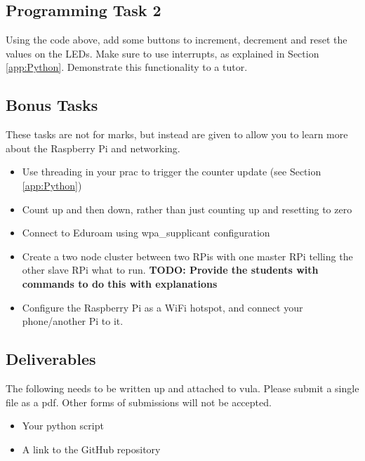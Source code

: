 \subsection{Programming Task 2}
Using the code above, add some buttons to increment, decrement and reset the values on the LEDs. Make sure to use interrupts, as explained in Section \ref{app:Python}. Demonstrate this functionality to a tutor.

\subsection{Bonus Tasks}
These tasks are not for marks, but instead are given to allow you to learn more about the Raspberry Pi and networking. 
\begin{itemize}
    \item Use threading in your prac to trigger the counter update (see Section \ref{app:Python})
    \item Count up and then down, rather than just counting up and resetting to zero
    \item Connect to Eduroam using wpa\_supplicant configuration
    \item Create a two node cluster between two RPis with one master RPi telling the other slave RPi what to run. \textbf{TODO: Provide the students with commands to do this with explanations} 
    \item Configure the Raspberry Pi as a WiFi hotspot, and connect your phone/another Pi to it.
\end{itemize}

\subsection{Deliverables}
The following needs to be written up and attached to vula. Please submit a single file as a pdf. Other forms of submissions will not be accepted.
\begin{itemize}
    \item Your python script
    \item A link to the GitHub repository
\end{itemize}